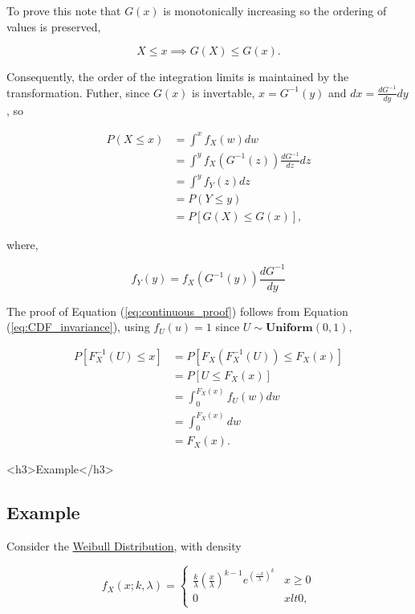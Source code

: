 \documentclass[12pt]{article}
\begin{document}
To prove this note that $G(x)$ is monotonically increasing so the ordering of values is preserved,

$$ X \le x \implies G(X) \le G(x).$$

Consequently, the order of the integration limits is maintained by the transformation. Futher, since $G(x)$ is invertable,
$x = G^{-1}(y)$ and $dx = \frac{dG^{-1}}{dy} dy$, so

$$
\begin{aligned}
P(X \leq x) & = \int^{x} f_X(w) dw \\
& = \int^{y} f_X(G^{-1}(z)) \frac{dG^{-1}}{dz} dz \\
& = \int^{y} f_Y(z) dz \\
& = P(Y \leq y) \\
& = P[G(X) \leq G(x)],
\end{aligned}
$$

where,

$$ f_Y(y) = f_X(G^{-1}(y)) \frac{dG^{-1}}{dy} $$

The proof of Equation (\ref{eq:continuous_proof}) follows from Equation (\ref{eq:CDF_invariance}), using $f_U(u) = 1$
since $U \sim \textbf{Uniform}(0, 1),$

$$
\begin{aligned}
P[F_X^{-1}(U) \leq x] & = P[F_X(F_X^{-1}(U)) \leq F_X(x)] \\
& = P[U \leq F_X(x)] \\
& = \int_{0}^{F_X(x)} f_U(w) dw \\
& = \int_{0}^{F_X(x)} dw \\
& = F_X(x).
\end{aligned}
$$

\ifblog
<h3>Example</h3>
\fi
\iftex
\subsection{Example}
\fi

Consider the \href{https://en.wikipedia.org/wiki/Weibull_distribution}{Weibull Distribution}, with density

\begin{equation}
\label{eq:Weibull_distribution}
f_X(x; k, \lambda) =
\begin{cases}
\frac{k}{\lambda}\left(\frac{x}{\lambda} \right)^{k-1} e^{\left(\frac{-x}{\lambda}\right)^k} & x \geq 0 \\
0 & x lt 0,
\end{cases}
\end{equation}
\end{document}
